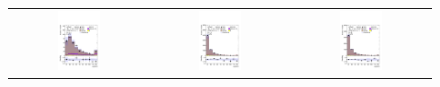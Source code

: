 %
\begin{figure}[H]
\centering
\begin{tabular}{@{}ccc@{}}
\includegraphics[page=1,width=0.33\textwidth]{figures/new_pt/reg1l2tau1bnj_os.pdf} &
\includegraphics[page=1,width=0.33\textwidth]{figures/new_pt/reg1l1tau1b1j_ss.pdf}&
\includegraphics[page=1,width=0.33\textwidth]{figures/new_pt/reg1l1tau1b2j_ss.pdf}\\

\end{tabular}
\end{figure}
